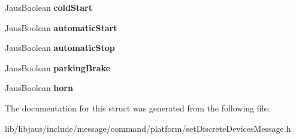 \begin{DoxyCompactItemize}
\item 
\hypertarget{struct_set_discrete_devices_message_struct_ad30793f9fd5f71039faa9199b4c95a53}{\-Jaus\-Boolean {\bfseries cold\-Start}}\label{struct_set_discrete_devices_message_struct_ad30793f9fd5f71039faa9199b4c95a53}

\item 
\hypertarget{struct_set_discrete_devices_message_struct_a86119973245b3786bca2027f5fc1c785}{\-Jaus\-Boolean {\bfseries automatic\-Start}}\label{struct_set_discrete_devices_message_struct_a86119973245b3786bca2027f5fc1c785}

\item 
\hypertarget{struct_set_discrete_devices_message_struct_acc9fd55fe15f0e747d6959dbc09d3068}{\-Jaus\-Boolean {\bfseries automatic\-Stop}}\label{struct_set_discrete_devices_message_struct_acc9fd55fe15f0e747d6959dbc09d3068}

\item 
\hypertarget{struct_set_discrete_devices_message_struct_aa140dc8a545a4f00fc44772753938984}{\-Jaus\-Boolean {\bfseries parking\-Brake}}\label{struct_set_discrete_devices_message_struct_aa140dc8a545a4f00fc44772753938984}

\item 
\hypertarget{struct_set_discrete_devices_message_struct_a483e827a55f08b2796867180a34f1fa5}{\-Jaus\-Boolean {\bfseries horn}}\label{struct_set_discrete_devices_message_struct_a483e827a55f08b2796867180a34f1fa5}

\end{DoxyCompactItemize}


\-The documentation for this struct was generated from the following file\-:\begin{DoxyCompactItemize}
\item 
lib/libjaus/include/message/command/platform/set\-Discrete\-Devices\-Message.\-h\end{DoxyCompactItemize}
